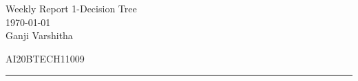 \documentclass[12pt,letterpaper, onecolumn]{exam}
\begin{document}
\newtheorem{theorem}{Theorem}[section]
\newtheorem{problem}{Problem}
\newtheorem{proposition}{Proposition}[section]
\newtheorem{lemma}{Lemma}[section]
\newtheorem{corollary}[theorem]{Corollary}
\newtheorem{example}{Example}[section]
\newtheorem{definition}[problem]{Definition}

\newcommand{\BEQA}{\begin{eqnarray}}
\newcommand{\EEQA}{\end{eqnarray}}
\newcommand{\define}{\stackrel{\triangle}{=}}

\raggedbottom
\setlength{\parindent}{0pt}
\providecommand{\mbf}{\mathbf}
\providecommand{\norm}[1]{\lVert#1\rVert}
\providecommand{\pr}[1]{\ensuremath{\Pr\left(#1\right)}}
\providecommand{\qfunc}[1]{\ensuremath{Q\left(#1\right)}}
\providecommand{\sbrak}[1]{\ensuremath{{}\left[#1\right]}}
\providecommand{\lsbrak}[1]{\ensuremath{{}\left[#1\right.}}
\providecommand{\rsbrak}[1]{\ensuremath{{}\left.#1\right]}}
\providecommand{\brak}[1]{\ensuremath{\left(#1\right)}}
\providecommand{\lbrak}[1]{\ensuremath{\left(#1\right.}}
\providecommand{\rbrak}[1]{\ensuremath{\left.#1\right)}}
\providecommand{\cbrak}[1]{\ensuremath{\left\{#1\right\}}}
\providecommand{\lcbrak}[1]{\ensuremath{\left\{#1\right.}}
\providecommand{\rcbrak}[1]{\ensuremath{\left.#1\right\}}}
\let\vec\mathbf




\begingroup  
    \centering
    
    \LARGE Weekly Report 1-Decision Tree \\[0.5em]
    \large \today\\[0.5em]
    \large Ganji Varshitha\par
    \large AI20BTECH11009\par
\endgroup
\rule{\textwidth}{0.4pt}
\pointsdroppedatright   %
\printanswers
\newcommand\Solution{
  \textbf{Solution:}\\}
\newcommand{\myvec}[1]{\ensuremath{\begin{bmatrix}#1\end{bmatrix}}}
\end{document}
